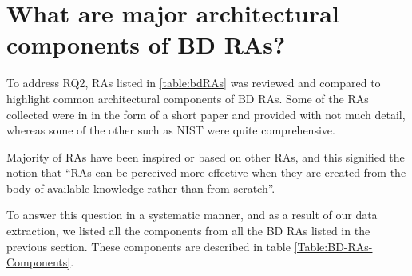 \documentclass[review]{elsarticle}
\begin{document}
\section{What are major architectural components of BD RAs? }

To address RQ2, RAs listed in \ref{table:bdRAs} was reviewed and compared to highlight common architectural components of BD RAs. Some of the RAs collected were in in the form of a short paper and provided with not much detail, whereas some of the other such as NIST were quite comprehensive. 

Majority of RAs have been inspired or based on other RAs, and this signified the notion that “RAs can be perceived more effective when they are created from the body of available knowledge rather than from scratch”.

To answer this question in a systematic manner, and as a result of our data extraction, we listed all the components from all the BD RAs listed in the previous section. These components are described in table \ref{Table:BD-RAs-Components}.
\end{document}
